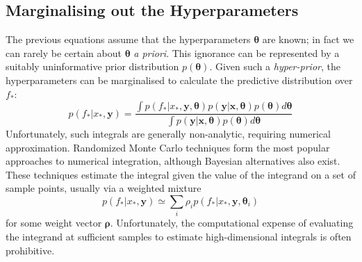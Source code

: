 \documentclass{article}
\newcommand\jansays[1]{\textcolor{blue}{Jan says: #1}}
\newcommand{\vect}[1]{\mathbf{#1}}
\newcommand{\xd}{\vect{x}}
\newcommand{\yd}{\vect{y}}
\begin{document}
\subsection{Marginalising out the Hyperparameters}
The previous equations assume that the hyperparameters $\bm{\theta}$ are known; in fact we can rarely be certain about $\bm{\theta}$ \emph{a priori}. This ignorance can be represented by a suitably uninformative prior distribution $p(\bm{\theta})$. Given such a \emph{hyper-prior}, the hyperparameters can be marginalised to calculate the predictive distribution over $f_*$:
\begin{equation}\label{fullmargint}
p(f_* |x_*, \yd) = \frac{\int p(f_* | x_*, \yd,\bm{\theta})p(\yd|\xd,\bm{\theta})p(\bm{\theta})d\bm{\theta}}{\int p(\yd|\xd,\bm{\theta})p(\bm{\theta})d\bm{\theta}}
\end{equation}
Unfortunately, such integrals are generally non-analytic, requiring numerical approximation. Randomized Monte Carlo techniques \cite{chen2000monte} form the most popular approaches to numerical integration, although Bayesian alternatives \cite{bayesquad, osbornebayesquad} also exist. 
These techniques estimate the integral given
the value of the integrand on a set of sample points, usually via a weighted mixture
\begin{equation}\label{sampling}
p(f_* |x_*, \yd) \simeq \sum_i \rho_i p(f_* | x_*, \yd,\bm{\theta}_i)
\end{equation}
for some weight vector $\bm{\rho}$. Unfortunately, the computational expense of evaluating the integrand at sufficient samples to estimate high-dimensional integrals is often prohibitive. %
\end{document}
